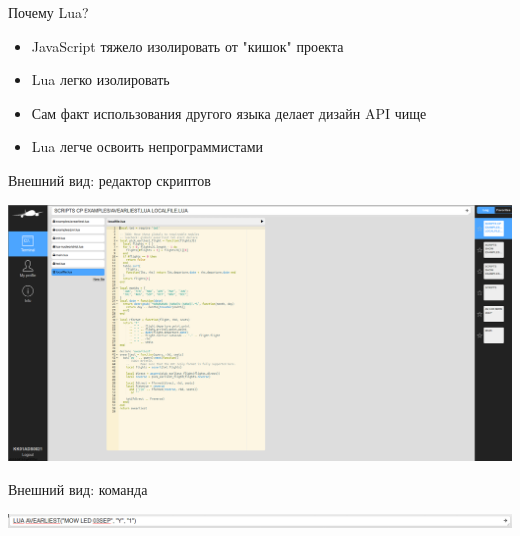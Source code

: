 \documentclass[aspectratio=169,handout,bigger]{beamer}
\begin{document}

\begin{frame}{Почему Lua?}

\begin{itemize}
\item JavaScript тяжело изолировать от "кишок" проекта
\item Lua легко изолировать
\item Сам факт использования другого языка делает дизайн API чище
\item Lua легче освоить непрограммистами
\end{itemize}

\end{frame}


\begin{frame}{Внешний вид: редактор скриптов}

\includegraphics[width=.90\textwidth]{scripts}

\end{frame}


\begin{frame}{Внешний вид: команда}

\includegraphics[width=.90\textwidth]{command}

\end{frame}

\end{document}

